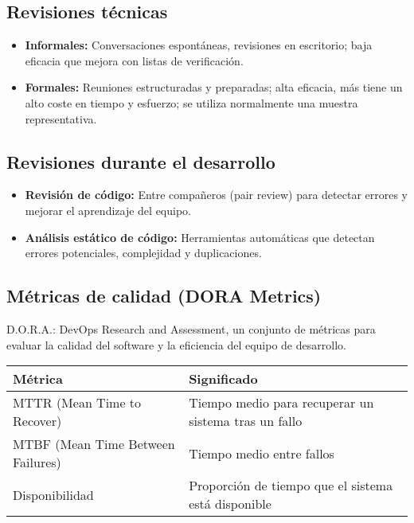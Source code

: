 \subsection{Revisiones técnicas}\label{subsec:revisiones-tecnicas}

\begin{itemize}
    \item \textbf{Informales:} Conversaciones espontáneas, revisiones en escritorio; baja eficacia que mejora con listas de verificación.
    \item \textbf{Formales:} Reuniones estructuradas y preparadas; alta eficacia, más tiene un alto coste en tiempo y esfuerzo; se utiliza normalmente una muestra representativa.
\end{itemize}

\subsection{Revisiones durante el desarrollo}\label{subsec:revisiones-durante-el-desarrollo}

\begin{itemize}
    \item \textbf{Revisión de código:} Entre compañeros (pair review) para detectar errores y mejorar el aprendizaje del equipo.
    \item \textbf{Análisis estático de código:} Herramientas automáticas que detectan errores potenciales, complejidad y duplicaciones.
\end{itemize}

\subsection{Métricas de calidad (DORA Metrics)}\label{subsec:metricas-de-calidad-(dora-metrics)}

\begin{definicion}
    D.O.R.A.: DevOps Research and Assessment, un conjunto de métricas para evaluar la calidad del software y la eficiencia del equipo de desarrollo.
\end{definicion}


\begin{center}
    \begin{tabular}{|l|l|}
        \hline
        \textbf{Métrica}                  & \textbf{Significado}                                 \\
        \hline
        MTTR (Mean Time to Recover)       & Tiempo medio para recuperar un sistema tras un fallo \\
        MTBF (Mean Time Between Failures) & Tiempo medio entre fallos                            \\
        Disponibilidad                    & Proporción de tiempo que el sistema está disponible  \\
        \hline
    \end{tabular}
\end{center}

